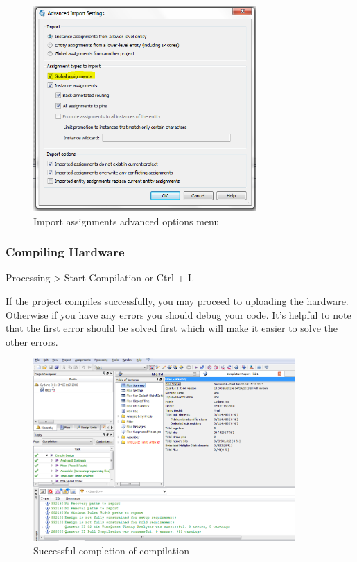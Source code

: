 \begin{figure}[H]
	\centering
	\includegraphics[width=85mm]{Lab1/figures/advancedimport.png}
	\caption{Import assignments advanced options menu}
	\label{fig:advancedimport}
\end{figure}
\subsubsection{Compiling Hardware}

Processing > Start Compilation or Ctrl + L

If the project compiles successfully, you may proceed to uploading the hardware. Otherwise if you have any errors you should debug your code. It's helpful to note that the first error should be solved first which will make it easier to solve the other errors.

\begin{figure}[H]
	\centering
	\includegraphics[width=100mm]{Lab1/figures/compileresults.png}
	\caption{Successful completion of compilation}
	\label{fig:compileresuts}
\end{figure}


